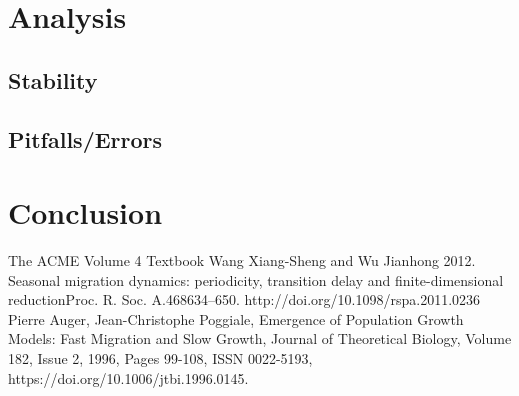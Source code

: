 \documentclass[11pt]{amsart}
\newcommand{\A}{{\mathrm{A}}}
\begin{document}


\section{Analysis}

\subsection{Stability}



\subsection{Pitfalls/Errors}



\section{Conclusion}



\FloatBarrier %
\newpage


\begin{thebibliography}{99}
 The ACME Volume 4 Textbook
 Wang Xiang-Sheng and Wu Jianhong 2012. Seasonal migration dynamics: periodicity, transition delay and finite-dimensional reductionProc. R. Soc. A.468634–650. http://doi.org/10.1098/rspa.2011.0236
 Pierre Auger, Jean-Christophe Poggiale, Emergence of Population Growth Models: Fast Migration and Slow Growth, Journal of Theoretical Biology, Volume 182, Issue 2, 1996, Pages 99-108, ISSN 0022-5193, https://doi.org/10.1006/jtbi.1996.0145.
\end{thebibliography}
\end{document}
